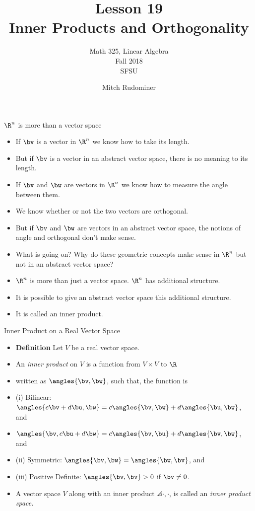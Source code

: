 \documentclass{beamer}
\title{Lesson 19 \\ Inner Products and Orthogonality}
\subtitle{Math 325, Linear Algebra \\ Fall 2018 \\ SFSU}
\author{Mitch Rudominer}
\date{}
\begin{document}
\begin{frame}
  \titlepage
\end{frame}


\begin{frame}{$\R^n$ is more than a vector space}

\begin{itemize}
\item If $\bv$ is a vector in $\R^n$ we know how to take its length.
\item But if $\bv$ is a vector in an abstract vector space, there is no meaning to its length.
\item If $\bv$ and $\bw$ are vectors in $\R^n$ we know how to measure the angle between them.
\item We know whether or not the two vectors are orthogonal.
\item But if $\bv$ and $\bw$ are vectors in an abstract vector space, the notions of angle and orthogonal don't make sense.
\item What is going on? Why do these geometric concepts make sense in $\R^n$ but not in an abstract vector space?
\item $\R^n$ is more than just a vector space. $\R^n$ has additional structure.
\item It is possible to give an abstract vector space this additional structure.
\item It is called an inner product.
\end{itemize}
\end{frame}


\begin{frame}{Inner Product on a Real Vector Space}

\begin{itemize}
\item \textbf{Definition} Let $V$ be a real vector space.
\item An \emph{inner product} on $V$ is a function from $V\times V$ to $\R$
\item written as $\angles{\bv,\bw}$, such that, the function is
\item (i) Bilinear: $\angles{c\bv+d\bu,\bw} = c\angles{\bv,\bw} + d\angles{\bu,\bw}$, and
\item $\angles{\bv,c\bu + d\bw} = c\angles{\bv,\bu} + d\angles{\bv,\bw}$, and
\item (ii) Symmetric: $\angles{\bv,\bw}=\angles{\bw,\bv}$, and
\item (iii) Positive Definite: $\angles{\bv,\bv} > 0$ if $\bv\not=0$.
\item A vector space $V$ along with an inner product $\angles{\cdot, \cdot}$, is
called an \emph{inner product space.}
\end{itemize}
\end{frame}
\end{document}
